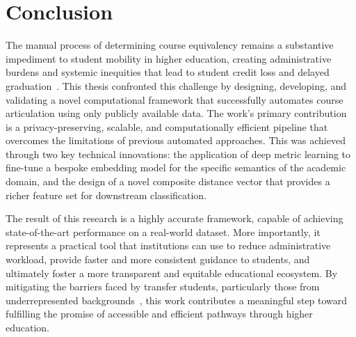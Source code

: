 \section{Conclusion}\label{ch:5.4}
The manual process of determining course equivalency remains a substantive impediment to student mobility in higher education, creating administrative burdens and systemic inequities that lead to student credit loss and delayed graduation~\cite{gao2017, collegeopportunity2017}. This thesis confronted this challenge by designing, developing, and validating a novel computational framework that successfully automates course articulation using only publicly available data. The work's primary contribution is a privacy-preserving, scalable, and computationally efficient pipeline that overcomes the limitations of previous automated approaches. This was achieved through two key technical innovations: the application of deep metric learning to fine-tune a bespoke embedding model for the specific semantics of the academic domain, and the design of a novel composite distance vector that provides a richer feature set for downstream classification.

The result of this research is a highly accurate framework, capable of achieving state-of-the-art performance on a real-world dataset. More importantly, it represents a practical tool that institutions can use to reduce administrative workload, provide faster and more consistent guidance to students, and ultimately foster a more transparent and equitable educational ecosystem. By mitigating the barriers faced by transfer students, particularly those from underrepresented backgrounds~\cite{ace2025}, this work contributes a meaningful step toward fulfilling the promise of accessible and efficient pathways through higher education.